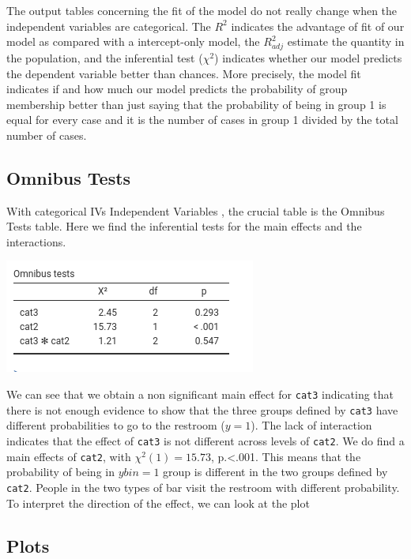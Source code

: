 \documentclass[
]{book}
\begin{document}
The output tables concerning the fit of the model do not really change when the independent variables are categorical. The \(R^2\) indicates the advantage of fit of our model as compared with a intercept-only model, the \(R^2_{adj}\) estimate the quantity in the population, and the inferential test (\(\chi^2\)) indicates whether our model predicts the dependent variable better than chances. More precisely, the model fit indicates if and how much our model predicts the probability of group membership better than just saying that the probability of being in group 1 is equal for every case and it is the number of cases in group 1 divided by the total number of cases.

\hypertarget{omnibus-tests-2}{%
\subsection{Omnibus Tests}\label{omnibus-tests-2}}

With categorical {IVs {Independent Variables} }, the crucial table is the {Omnibus Tests} table. Here we find the inferential tests for the main effects and the interactions.

\includegraphics{bookletpics/3_logistic_output8.png}

We can see that we obtain a non significant main effect for \texttt{cat3} indicating that there is not enough evidence to show that the three groups defined by \texttt{cat3} have different probabilities to go to the restroom (\(y=1\)). The lack of interaction indicates that the effect of \texttt{cat3} is not different across levels of \texttt{cat2}. We do find a main effects of \texttt{cat2}, with \(\chi^2(1)=15.73\), p.\textless.001. This means that the probability of being in \(ybin=1\) group is different in the two groups defined by \texttt{cat2}. People in the two types of bar visit the restroom with different probability. To interpret the direction of the effect, we can look at the plot

\hypertarget{plots-1}{%
\subsection{Plots}\label{plots-1}}
\end{document}

